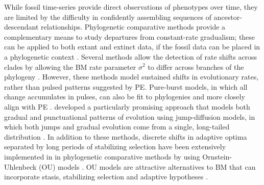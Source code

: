 While fossil time-series provide direct observations of phenotypes over time, they are limited by the difficulty in confidently assembling sequences of ancestor-descendant relationships. Phylogenetic comparative methods provide a complementary means to study departures from constant-rate gradualism; these can be applied to both extant and extinct data, if the fossil data can be placed in a phylogenetic context \citep{PennellHarmon}. Several methods allow the detection of rate shifts across clades by allowing the BM rate parameter $\sigma^2$ to differ across branches of the phylogeny \citep[e.g.,][]{Omeara2006, Eastman2011, Slater2012MECCA}. However, these methods model sustained shifts in evolutionary rates, rather than pulsed patterns suggested by PE. Pure-burst models, in which all change accumulates in pulses, can also be fit to phylogenies and more closely align with PE \citep{HansenMartins1996, Khaitovich2005, Uyeda2011}. \citet{Landis2012} developed a particularly promising approach that models both gradual and punctuational patterns of evolution using jump-diffusion models, in which both jumps and gradual evolution come from a single, long-tailed distribution \citep[see also,][]{Eastmanjump}. In addition to these methods, discrete shifts in adaptive optima separated by long periods of stabilizing selection have been extensively implemented in in phylogenetic comparative methods by using Ornstein-Uhlenbeck (OU) models \citep{Felsenstein1988, Hansen1997, ButlerKing2004}. OU models are attractive alternatives to BM that can incorporate stasis, stabilizing selection and adaptive hypotheses \citep[][see \textsc{box 1} for further details]{PennellHarmon}. 

